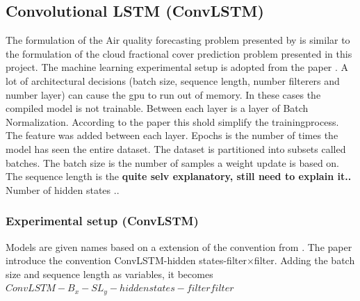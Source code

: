 \subsection{Convolutional LSTM (ConvLSTM)}

The formulation of the Air quality forecasting problem presented by  \citeauthor{SunAirLSTM} is similar to the formulation of the cloud fractional cover prediction problem presented in this project. The machine learning experimental setup is adopted from the paper . 
A lot of architectural decisions (batch size, sequence length, number filterers and number layer) can cause the \acrshort{gpu} to run out of memory. In these cases the compiled model is not trainable. Between each layer is a layer of Batch Normalization. According to the paper  this shold simplify the trainingprocess. The feature was added between each layer. Epochs is the number of times the model has seen the entire dataset. The dataset is partitioned into subsets called batches. The batch size is the number of samples a weight update is based on. The sequence length is the \textbf{quite selv explanatory, still need to explain it.. } Number of hidden states .. 

\subsubsection{Experimental setup (ConvLSTM)}
Models are given names based on a extension of the convention from . The paper introduce the convention ConvLSTM-hidden states-filter$\times$filter. Adding the batch size and sequence length as variables, it becomes \newline $ConvLSTM-B_{x}-SL_{y}-hidden states-filter$\times$filter$

